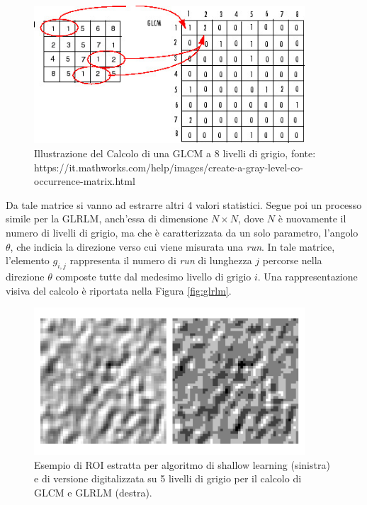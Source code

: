 \begin{figure}[h]
    \center
    \includegraphics[width=0.9\textwidth]{./assets/glcm.jpg}
    \caption{Illustrazione del Calcolo di una GLCM a 8 livelli di grigio, fonte: https://it.mathworks.com/help/images/create-a-gray-level-co-occurrence-matrix.html}
\end{figure}

Da tale matrice si vanno ad estrarre altri 4 valori statistici.
Segue poi un processo simile per la GLRLM, anch'essa di dimensione
$N \times N$, dove $N$ è nuovamente il numero di livelli di grigio,
ma che è caratterizzata da un solo parametro, l'angolo $\theta$,
che indicia la direzione verso cui viene misurata una {\it run}.
In tale matrice, l'elemento $g_{i,j}$ rappresenta il numero di {\it run}
di lunghezza $j$ percorse nella direzione $\theta$ composte tutte dal medesimo
livello di grigio $i$.
Una rappresentazione visiva del calcolo è riportata nella Figura \ref{fig:glrlm}.

\begin{figure}
    \center
    \includegraphics[width=0.9\textwidth]{./assets/roi-shallow.png}
    \caption{\label{fig:roi-shallow} Esempio di ROI estratta per algoritmo di shallow learning (sinistra) e
    di versione digitalizzata su 5 livelli di grigio per il calcolo di GLCM e GLRLM (destra).}
\end{figure}


